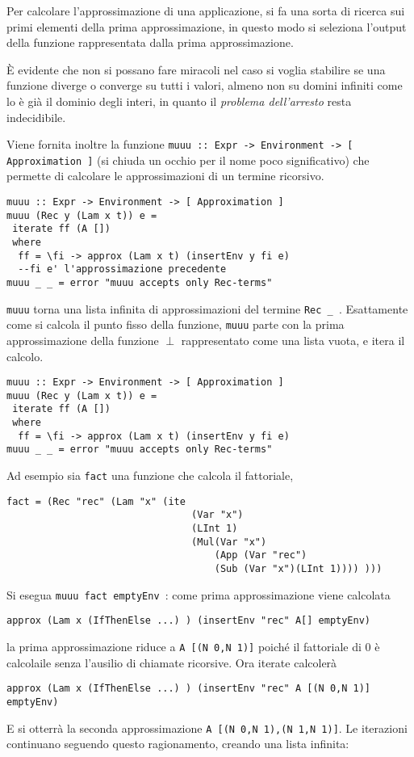 \documentclass{article}
\begin{document}
Per calcolare l'approssimazione di una applicazione, si fa una sorta di ricerca sui primi elementi della prima approssimazione, in questo modo si seleziona l'output della funzione rappresentata dalla prima approssimazione.

È evidente che non si possano fare miracoli nel caso si voglia stabilire se una funzione diverge o converge su tutti i valori, almeno non su domini infiniti come lo è già il dominio degli interi, in quanto il \emph{problema dell'arresto} resta indecidibile.

Viene fornita inoltre la funzione \texttt{muuu :: Expr -> Environment -> [ Approximation ]} (si chiuda un occhio per il nome poco significativo) che permette di calcolare le approssimazioni di un termine ricorsivo.

\begin{verbatim}
muuu :: Expr -> Environment -> [ Approximation ]
muuu (Rec y (Lam x t)) e =
 iterate ff (A [])
 where
  ff = \fi -> approx (Lam x t) (insertEnv y fi e) 
  --fi e' l'approssimazione precedente
muuu _ _ = error "muuu accepts only Rec-terms"
\end{verbatim}

\texttt{muuu} torna una lista infinita di approssimazioni del termine \texttt{Rec \_ }. Esattamente come si calcola il punto fisso della funzione, \texttt{muuu} parte con la prima approssimazione della funzione $\perp$ rappresentato come una lista vuota, e itera il calcolo.

\begin{verbatim}
muuu :: Expr -> Environment -> [ Approximation ]
muuu (Rec y (Lam x t)) e =
 iterate ff (A [])
 where
  ff = \fi -> approx (Lam x t) (insertEnv y fi e) 
muuu _ _ = error "muuu accepts only Rec-terms"
\end{verbatim}

Ad esempio sia \texttt{fact} una funzione che calcola il fattoriale, 

\begin{verbatim}
fact = (Rec "rec" (Lam "x" (ite 
                                (Var "x") 
                                (LInt 1)
                                (Mul(Var "x")
                                    (App (Var "rec")
                                    (Sub (Var "x")(LInt 1)))) )))
\end{verbatim}

Si esegua \texttt{muuu fact emptyEnv }:
come prima approssimazione viene calcolata 
\begin{verbatim}
approx (Lam x (IfThenElse ...) ) (insertEnv "rec" A[] emptyEnv)
\end{verbatim}
la prima approssimazione riduce a \texttt{A [(N 0,N 1)]} poiché il fattoriale di 0 è calcolaile senza l'ausilio di chiamate ricorsive.
Ora iterate calcolerà
\begin{verbatim}
approx (Lam x (IfThenElse ...) ) (insertEnv "rec" A [(N 0,N 1)] emptyEnv)
\end{verbatim}
E si otterrà la seconda approssimazione \texttt{A [(N 0,N 1),(N 1,N 1)]}.
Le iterazioni continuano seguendo questo ragionamento, creando una lista infinita:
\end{document}
